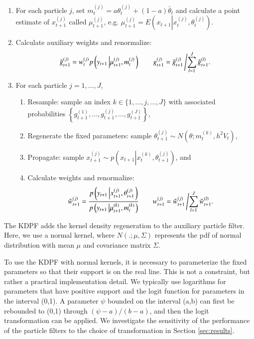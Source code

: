 \documentclass{elsarticle}
\begin{document}
\begin{enumerate}
\item For each particle $j$, set $m_t^{(j)} = a\theta_t^{(j)} + (1-a)\bar{\theta}_t$ and calculate a point estimate of $x_{t+1}^{(j)}$ called $\mu_{t+1}^{(j)}$, e.g. $\mu_{t+1}^{(j)} = E\left(x_{t+1}\left|x_t^{(j)},\theta_t^{(j)} \right.\right)$.
\item Calculate auxiliary weights and renormalize:
\[ \tilde{g}_{t+1}^{(j)} = w_t^{(j)} p\left(y_{t+1}\left|\mu_{t+1}^{(j)},m_t^{(j)}\right.\right) \qquad g_{t+1}^{(j)} = \tilde{g}_{t+1}^{(j)}\left/ \sum_{l=1}^J \tilde{g}_{t+1}^{(l)}. \right. \]
\item For each particle $j=1,\ldots,J$,
	\begin{enumerate}
    \item Resample: sample an index $k\in\{1,\ldots,j,\ldots,J\}$ with associated probabilities $\left\{g_{t+1}^{(1)},\ldots,g_{t+1}^{(j)},\ldots,g_{t+1}^{(J)}\right\}$,
	\item Regenerate the fixed parameters: sample $\theta_{t+1}^{(j)} \sim N\left(\theta; m_t^{(k)}, h^2V_t \right)$,
	\item Propagate: sample $x_{t+1}^{(j)} \sim p\left(x_{t+1}\left|x_t^{(k)},\theta_{t+1}^{(j)}\right.\right)$, and
	\item Calculate weights and renormalize:
	\[ \tilde{w}_{t+1}^{(j)} = \frac{p\left(y_{t+1}\left|x_{t+1}^{(j)},\theta_{t+1}^{(j)}\right.\right)}{p\left(y_{t+1}\left|\mu_{t+1}^{(k)},m_t^{(k)}\right.\right)}
	\qquad
	w_{t+1}^{(j)} = \tilde{w}_{t+1}^{(j)}\left/\sum_{l=1}^J \tilde{w}_{t+1}^{(l)}. \right. \]
	\end{enumerate}
\end{enumerate}

\noindent The KDPF adds the kernel density regeneration to the auxiliary particle filter. Here, we use a normal kernel, where $N(.;\mu,\Sigma)$ represents the pdf of normal distribution with mean $\mu$ and covariance matrix $\Sigma$.

To use the KDPF with normal kernels, it is necessary to parameterize the fixed parameters so that their support is on the real line. This is not a constraint, but rather a practical implementation detail. We typically use logarithms for parameters that have positive support and the logit function for parameters in the interval (0,1). A parameter $\psi$ bounded on the interval (a,b) can first be rebounded to (0,1) through $(\psi-a)/(b-a)$, and then the logit transformation can be applied. We investigate the sensitivity of the performance of the particle filters to the choice of transformation in Section \ref{sec:results}.
\end{document}
